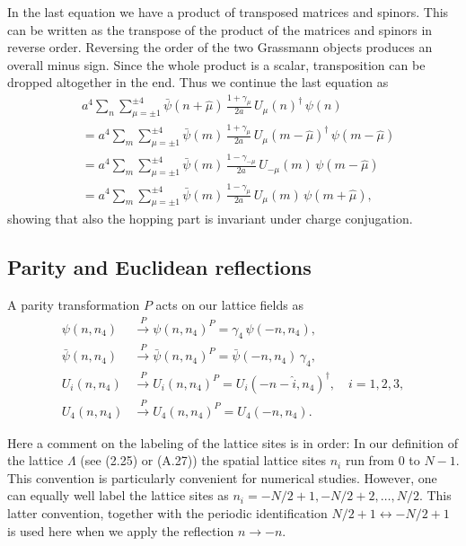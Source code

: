 In the last equation we have a product of transposed matrices and spinors.
This can be written as the transpose of the product of the matrices and spinors
in reverse order. Reversing the order of the two Grassmann objects produces
an overall minus sign. Since the whole product is a scalar, transposition can
be dropped altogether in the end. Thus we continue the last equation as
\begin{equation}
  \begin{aligned}
    &a^4\sum_{n}\sum_{\mu=\pm1}^{\pm4}\bar{\psi}(n+\hat{\mu})\,
      \frac{1+\gamma_\mu}{2a}\,U_\mu(n)^\dagger\,\psi(n)\\
    &= a^4\sum_{m}\sum_{\mu=\pm1}^{\pm4}\bar{\psi}(m)\,
      \frac{1+\gamma_\mu}{2a}\,U_\mu(m-\hat{\mu})^\dagger\,\psi(m-\hat{\mu})\\
    &= a^4\sum_{m}\sum_{\mu=\pm1}^{\pm4}\bar{\psi}(m)\,
      \frac{1-\gamma_{-\mu}}{2a}\,U_{-\mu}(m)\,\psi(m-\hat{\mu})\\
    &= a^4\sum_{m}\sum_{\mu=\pm1}^{\pm4}\bar{\psi}(m)\,
      \frac{1-\gamma_\mu}{2a}\,U_\mu(m)\,\psi(m+\hat{\mu}) ,
  \end{aligned}
\end{equation}
showing that also the hopping part is invariant under charge conjugation.

\subsection{Parity and Euclidean reflections}

A parity transformation $P$ acts on our lattice fields as
\begin{equation}
  \begin{aligned}
    \psi(n,n_4) &\xrightarrow{\;P\;} \psi(n,n_4)^P = \gamma_4\,\psi(-n,n_4),\\
    \bar{\psi}(n,n_4) &\xrightarrow{\;P\;} \bar{\psi}(n,n_4)^P = \bar{\psi}(-n,n_4)\,\gamma_4,\\
    U_i(n,n_4) &\xrightarrow{\;P\;} U_i(n,n_4)^P = U_i(-n-\hat{i},n_4)^\dagger, \quad i = 1, 2, 3,\\
    U_4(n,n_4) &\xrightarrow{\;P\;} U_4(n,n_4)^P = U_4(-n,n_4) .
  \end{aligned}
\end{equation}

Here a comment on the labeling of the lattice sites is in order: In our definition
of the lattice $\Lambda$ (see (2.25) or (A.27)) the spatial lattice sites $n_i$ run from $0$
to $N-1$. This convention is particularly convenient for numerical studies.
However, one can equally well label the lattice sites as $n_i = -N/2+1, -N/2+
2, \ldots, N/2$. This latter convention, together with the periodic identification
$N/2 + 1 \leftrightarrow -N/2 + 1$ is used here when we apply the reflection $n \to -n$.

